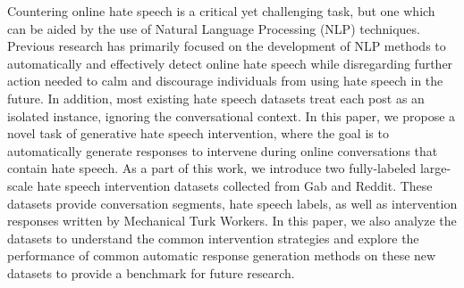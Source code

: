 Countering online hate speech is a critical yet challenging task, but one which can be aided by the use of Natural Language Processing (NLP) techniques. Previous research has primarily focused on the development of NLP methods to automatically and effectively detect online hate speech while disregarding further action needed to calm and discourage individuals from using hate speech in the future. In addition, most existing hate speech datasets treat each post as an isolated instance, ignoring the conversational context. In this paper, we propose a novel task of generative hate speech intervention, where the goal is to automatically generate responses to intervene during online conversations that contain hate speech. As a part of this work, we introduce two fully-labeled large-scale hate speech intervention datasets collected from Gab and Reddit. These datasets provide conversation segments, hate speech labels, as well as intervention responses written by  Mechanical Turk Workers. In this paper, we also analyze the datasets to understand the common intervention strategies and explore the performance of common automatic response generation methods on these new datasets to provide a benchmark for future research.
